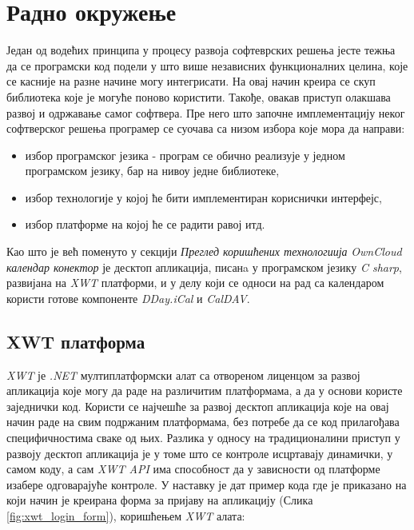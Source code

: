 \chapter{Радно окружење}
\label{chap:Radno okruzenje}

Један од водећих принципа у процесу развоја софтеврских решења јесте тежња да се програмски код подели у што више независних функционалних целина, које се касније на разне начине могу интегрисати. На овај начин креира се скуп библиотека које је могуће поново користити. Такође, овакав приступ олакшава развој и одржавање самог софтвера. Пре него што започне имплементацију неког софтверског решења програмер се суочава са низом избора које мора да направи:
\begin{itemize}
	\item {избор програмског језика - програм се обично реализује у једном програмском језику, бар на нивоу једне библиотеке},
	\item {избор технологије у којој ће бити имплементиран кориснички интерфејс},
	\item {избор платформе на којој ће се радити равој итд.} 
\end{itemize}

Као што је већ поменуто у секцији \textit{Преглед коришћених технологиија} \textit{OwnCloud календар конектор} је десктоп апликација, писанa у програмском језику \textit{C sharp}, развијана на \textit{XWT} платформи, и у делу који се односи на рад са календаром користи готове компоненте \textit{DDay.iCal} и \textit{CalDAV}.

\section {XWT платформа}

\textit{XWT} је \textit{.NET} мултиплатформски алат са отвореном лиценцом за развој апликација које могу да раде на различитим платформама, а да у основи користе заједнички код. Користи се најчешће за развој десктоп апликација које на овај начин раде на свим подржаним платформама, без потребе да се код прилагођава специфичностима сваке од њих. Разлика у односу на традиционалини приступ у развоју десктоп апликација је у томе што се контроле исцртавају динамички, у самом коду, а сам \textit{XWT API} има способност да у зависности од платформе изабере одговарајуће контроле. У наставку је дат пример кода где је приказано на који начин је креирана форма за пријаву на апликацију (Слика \ref{fig:xwt_login_form}), коришћењем \textit{XWT} алата:



